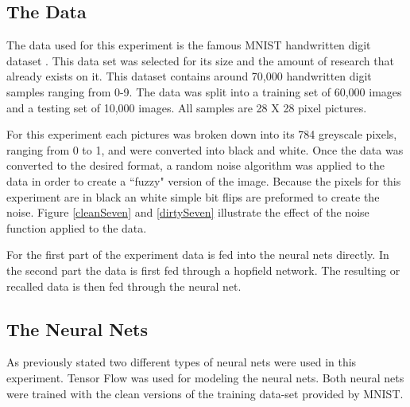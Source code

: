 \documentclass{IEEEtran}
\begin{document}
		\subsection{The Data}
			The data used for this experiment is the famous MNIST handwritten digit dataset \cite{MNIST}. This data set was selected for its size and the amount of research that already exists on it. This dataset contains around 70,000 handwritten digit samples ranging from 0-9. The data was split into a training set of 60,000 images and a testing set of 10,000 images. All samples are 28 X 28 pixel pictures. 
			
			For this experiment each pictures was broken down into its 784 greyscale pixels, ranging from 0 to 1, and were converted into black and white. Once the data was converted to the desired format, a random noise algorithm was applied to the data in order to create a ``fuzzy" version of the image. Because the pixels for this experiment are in black an white simple bit flips are preformed to create the noise. Figure \ref{cleanSeven} and \ref{dirtySeven} illustrate the effect of the noise function applied to the data. 
			
			For the first part of the experiment data is fed into the neural nets directly. In the second part the data is first fed through a hopfield network. The resulting or recalled data is then fed through the neural net.
			
			\begin{figure}
				\begin{floatrow}
				\end{floatrow}
			\end{figure}
			
		\subsection{The Neural Nets}
			As previously stated two different types of neural nets were used in this experiment. Tensor Flow was used for modeling the neural nets. Both neural nets were trained with the clean versions of the training data-set provided by MNIST.
			
\end{document}
